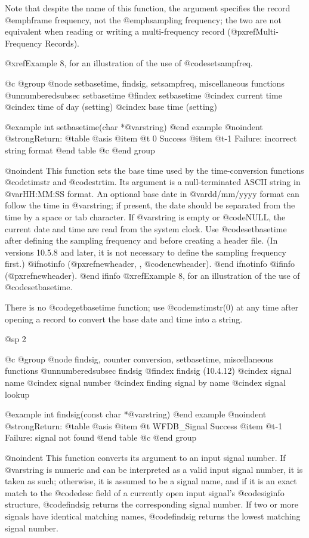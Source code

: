 {{{{{{{{Note that despite the name of this function, the argument specifies the record
@emph{frame} frequency, not the @emph{sampling} frequency; the two are not
equivalent when reading or writing a multi-frequency record
(@pxref{Multi-Frequency Records}).

@xref{Example 8}, for an illustration of the use of @code{setsampfreq}.

@c @group
@node     setbasetime, findsig, setsampfreq, miscellaneous functions
@unnumberedsubsec setbasetime
@findex setbasetime
@cindex current time
@cindex time of day (setting)
@cindex base time (setting)

@example
int setbasetime(char *@var{string})
@end example
@noindent
@strong{Return:}
@table @asis
@item @t{ 0}
Success
@item @t{-1}
Failure: incorrect string format
@end table
@c @end group

@noindent
This function sets the base time used by the time-conversion functions
@code{timstr} and @code{strtim}.  Its argument is a null-terminated
ASCII string in @var{HH:MM:SS} format.  An optional base date in
@var{dd/mm/yyyy} format can follow the time in @var{string}; if present,
the date should be separated from the time by a space or tab character.  If
@var{string} is empty or @code{NULL}, the current date and time are read
from the system clock.  Use @code{setbasetime} after defining the sampling
frequency and before creating a header file.  (In versions 10.5.8 and later,
it is not necessary to define the sampling frequency first.)
@ifnotinfo
(@pxref{newheader, , @code{newheader}}).
@end ifnotinfo
@ifinfo
(@pxref{newheader}).
@end ifinfo
@xref{Example 8}, for an illustration of the use of @code{setbasetime}.

There is no @code{getbasetime} function;  use @code{mstimstr(0)} at any
time after opening a record to convert the base date and time into a string.

@sp 2

@c @group
@node     findsig, counter conversion, setbasetime, miscellaneous functions
@unnumberedsubsec findsig
@findex findsig (10.4.12)
@cindex signal name
@cindex signal number
@cindex finding signal by name
@cindex signal lookup

@example
int findsig(const char *@var{string})
@end example
@noindent
@strong{Return:}
@table @asis
@item @t{ WFDB_Signal}
Success
@item @t{-1}
Failure: signal not found
@end table
@c @end group

@noindent
This function converts its argument to an input signal number.
If @var{string} is numeric and can be interpreted as a valid
input signal number, it is taken as such;  otherwise, it is
assumed to be a signal name, and if it is an exact match to the
@code{desc} field of a currently open input signal's @code{siginfo}
structure, @code{findsig} returns the corresponding signal number.
If two or more signals have identical matching names, @code{findsig}
returns the lowest matching signal number.


}}}}}}}}
